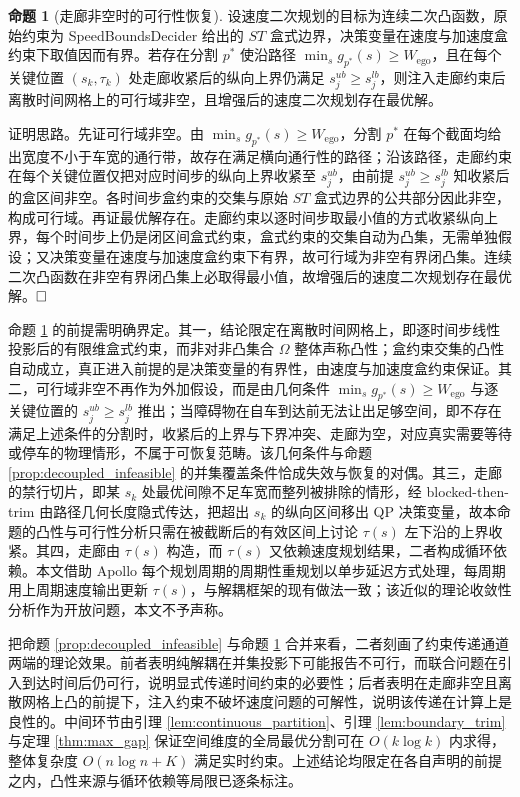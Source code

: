 \documentclass[a4paper,11pt]{ctexart}
\theoremstyle{definition}
\newtheorem{proposition}{命题}[section]
\begin{document}
\begin{proposition}[走廊非空时的可行性恢复]
\label{prop:feasibility_recovery}
设速度二次规划的目标为连续二次凸函数，原始约束为 SpeedBoundsDecider 给出的 $ST$ 盒式边界，决策变量在速度与加速度盒约束下取值因而有界。若存在分割 $p^{*}$ 使沿路径 $\min_s g_{p^{*}}(s) \geq W_{\text{ego}}$，且在每个关键位置 $(s_k, \tau_k)$ 处走廊收紧后的纵向上界仍满足 $s_j^{ub} \geq s_j^{lb}$，则注入走廊约束后离散时间网格上的可行域非空，且增强后的速度二次规划存在最优解。
\end{proposition}

证明思路。先证可行域非空。由 $\min_s g_{p^{*}}(s) \geq W_{\text{ego}}$，分割 $p^{*}$ 在每个截面均给出宽度不小于车宽的通行带，故存在满足横向通行性的路径；沿该路径，走廊约束在每个关键位置仅把对应时间步的纵向上界收紧至 $s_j^{ub}$，由前提 $s_j^{ub} \geq s_j^{lb}$ 知收紧后的盒区间非空。各时间步盒约束的交集与原始 $ST$ 盒式边界的公共部分因此非空，构成可行域。再证最优解存在。走廊约束以逐时间步取最小值的方式收紧纵向上界，每个时间步上仍是闭区间盒式约束，盒式约束的交集自动为凸集，无需单独假设；又决策变量在速度与加速度盒约束下有界，故可行域为非空有界闭凸集。连续二次凸函数在非空有界闭凸集上必取得最小值，故增强后的速度二次规划存在最优解。$\hfill\Box$

命题 \ref{prop:feasibility_recovery} 的前提需明确界定。其一，结论限定在离散时间网格上，即逐时间步线性投影后的有限维盒式约束，而非对非凸集合 $\Omega$ 整体声称凸性；盒约束交集的凸性自动成立，真正进入前提的是决策变量的有界性，由速度与加速度盒约束保证。其二，可行域非空不再作为外加假设，而是由几何条件 $\min_s g_{p^{*}}(s) \geq W_{\text{ego}}$ 与逐关键位置的 $s_j^{ub} \geq s_j^{lb}$ 推出；当障碍物在自车到达前无法让出足够空间，即不存在满足上述条件的分割时，收紧后的上界与下界冲突、走廊为空，对应真实需要等待或停车的物理情形，不属于可恢复范畴。该几何条件与命题 \ref{prop:decoupled_infeasible} 的并集覆盖条件恰成失效与恢复的对偶。其三，走廊的禁行切片，即某 $s_k$ 处最优间隙不足车宽而整列被排除的情形，经 blocked-then-trim 由路径几何长度隐式传达，把超出 $s_k$ 的纵向区间移出 QP 决策变量，故本命题的凸性与可行性分析只需在被截断后的有效区间上讨论 $\tau(s)$ 左下沿的上界收紧。其四，走廊由 $\tau(s)$ 构造，而 $\tau(s)$ 又依赖速度规划结果，二者构成循环依赖。本文借助 Apollo 每个规划周期的周期性重规划以单步延迟方式处理，每周期用上周期速度输出更新 $\tau(s)$，与解耦框架的现有做法一致；该近似的理论收敛性分析作为开放问题，本文不予声称。

把命题 \ref{prop:decoupled_infeasible} 与命题 \ref{prop:feasibility_recovery} 合并来看，二者刻画了约束传递通道两端的理论效果。前者表明纯解耦在并集投影下可能报告不可行，而联合问题在引入到达时间后仍可行，说明显式传递时间约束的必要性；后者表明在走廊非空且离散网格上凸的前提下，注入约束不破坏速度问题的可解性，说明该传递在计算上是良性的。中间环节由引理 \ref{lem:continuous_partition}、引理 \ref{lem:boundary_trim} 与定理 \ref{thm:max_gap} 保证空间维度的全局最优分割可在 $O(k \log k)$ 内求得，整体复杂度 $O(n \log n + K)$ 满足实时约束。上述结论均限定在各自声明的前提之内，凸性来源与循环依赖等局限已逐条标注。
\end{document}
